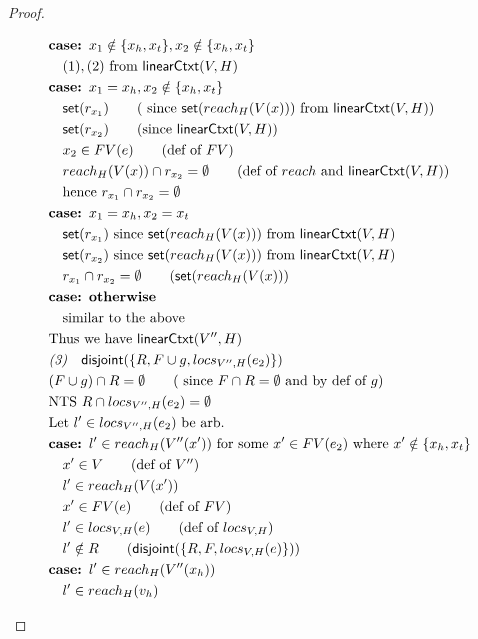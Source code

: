 \documentclass{easychair}
\newcommand{\ms}[1]{\ensuremath{\mathsf{#1}}}
\newcommand{\na}[1]{\mathsf{linearCtxt}(#1)}
\newcommand{\dist}[1]{\mathsf{disjoint}(#1)}
\theoremstyle{definition}
\begin{document}
\begin{proof}
\begin{description}
\begin{align*}
  & \textbf{case: } x_1 \notin \{x_h,x_t\}, x_2 \notin \{x_h,x_t\}\\
  &\quad (1), (2) \text{ from } \na{V,H}\\
  & \textbf{case: } x_1 = x_h, x_2 \notin \{x_h,x_t\}\\
  &\quad \ms{set}(r_{x_1}) \tag{ since $\ms{set}(reach_H(V(x)))$ from  $\na{V,H}$}\\
  &\quad \ms{set}(r_{x_2}) \tag{since  $\na{V,H}$}\\
  &\quad x_2 \in FV(e) \tag{def of $FV$}\\
  &\quad reach_H(V(x)) \cap r_{x_2} = \emptyset \tag{def of $reach$ and $\na{V,H}$}\\
  &\quad \text{hence } r_{x_1} \cap r_{x_2} = \emptyset\\
  &\textbf{case: } x_1 = x_h, x_2 = x_t\\
  &\quad \ms{set}(r_{x_1}) \text{ since } \ms{set}(reach_{H}(V(x))) \text{ from } \na{V,H}\\
  &\quad \ms{set}(r_{x_2}) \text{ since } \ms{set}(reach_H(V(x))) \text{ from } \na{V,H}\\
  &\quad r_{x_1} \cap r_{x_2} = \emptyset \tag{$\ms{set}(reach_H(V(x))$}\\
  & \textbf{case: otherwise} \\
  &\quad \text{similar to the above}\\
  &\text{Thus we have } \na{V'',H}\\
  &\emph{(3)}\quad \dist{\{R,F \cup g,locs_{V'',H}(e_2)\}}\\
  &(F \cup g) \cap R = \emptyset \tag{ since $F \cap R = \emptyset$ and by def of $g$}\\
  &\text{NTS } R \cap locs_{V'',H}(e_2) = \emptyset\\
  &\text{Let } l' \in locs_{V'',H}(e_2) \text{ be arb.}\\
  &\textbf{case: }  l' \in reach_{H}(V''(x')) \text{ for some $x' \in FV(e_2)$ where } x' \notin \{x_h,x_t\}\\
  &\quad x' \in V \tag{def of $V''$}\\
  &\quad l' \in reach_{H}(V(x'))\\
  &\quad x' \in FV(e) \tag{def of $FV$}\\
  &\quad l' \in locs_{V,H}(e) \tag{def of $locs_{V,H}$}\\
  &\quad l' \notin R \tag{$\dist{\{R,F,locs_{V,H}(e)\}}$}\\
  &\textbf{case: }  l' \in reach_{H}(V''(x_h)) \\
  &\quad l' \in reach_{H}(v_h)\\

\end{align*}
\end{description}
\end{proof}
\end{document}

